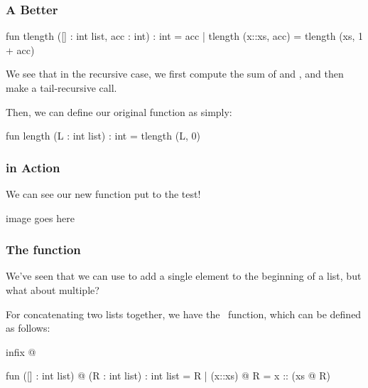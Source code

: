 \documentclass[aspectratio=169]{beamer}
\begin{document}
\begin{frame}[fragile]
  \frametitle{A Better }

  \begin{codeblock}
    fun tlength ([] : int list, acc : int) : int = acc
      | tlength (x::xs, acc) = tlength (xs, 1 + acc) 
  \end{codeblock}

  \vspace{\fill}

  We see that in the recursive case, we first compute the sum of  and ,
  and then make a tail-recursive call.

  \vspace{\fill}

  Then, we can define our original  function as simply:
  \begin{codeblock}
    fun length (L : int list) : int = tlength (L, 0)
  \end{codeblock}
\end{frame}




\begin{frame}[fragile]
  \frametitle{ in Action}

  We can see our new  function put to the test!

  image goes here
\end{frame}


\begin{frame}[fragile]
  \frametitle{The  function}

  We've seen that we can use \code{::} to add a single element to the beginning of a list, 
  but what about multiple? 

  \vspace{\fill}

  For concatenating two lists together, we have the \footnotemark \, function, which 
  can be defined as follows:

  \begin{codeblock}
    infix @ 

    fun ([] : int list) @ (R : int list) : int list = R  
      | (x::xs) @ R = x :: (xs @ R) 
  \end{codeblock}

\end{frame}
\end{document}
